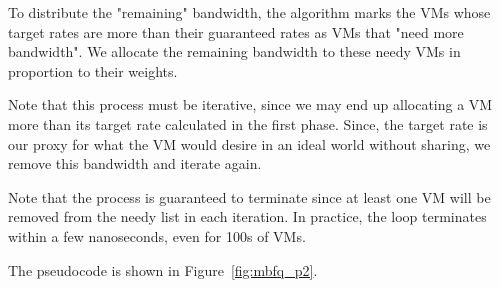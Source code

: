 To distribute the "remaining" bandwidth, the algorithm marks the VMs whose
target rates are more than their guaranteed rates as VMs that "need more
bandwidth".  We allocate the remaining bandwidth to these needy VMs in
proportion to their weights.  

Note that this process must be iterative, since we may end up allocating a VM
more than its target rate calculated in the first phase.  Since, the target rate
is our proxy for what the VM would desire in an ideal world without sharing, we
remove this bandwidth and iterate again. 

Note that the process is guaranteed to terminate since at least one VM will be
removed from the needy list in each iteration. In practice, the loop terminates
within a few nanoseconds, even for 100s of VMs.

The pseudocode is shown in Figure~\ref{fig:mbfq_p2}.
